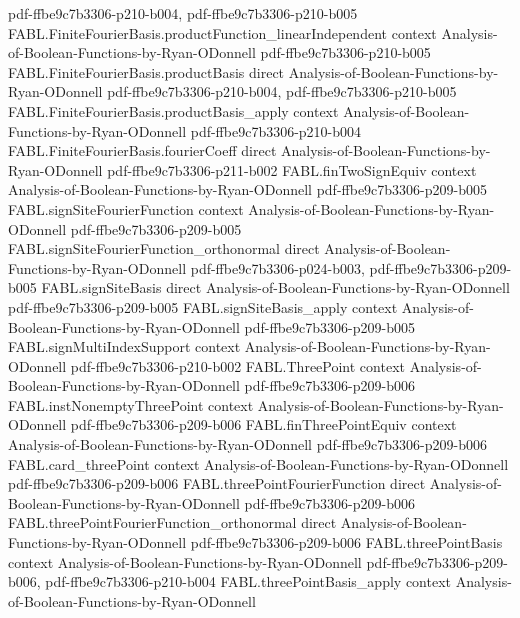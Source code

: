\begin{theorem}
  {pdf-ffbe9c7b3306-p210-b004,
    pdf-ffbe9c7b3306-p210-b005}
\proofstep
  {FABL.FiniteFourierBasis.productFunction_linearIndependent}
  {context}
  {Analysis-of-Boolean-Functions-by-Ryan-ODonnell}
  {pdf-ffbe9c7b3306-p210-b005}
\proofstep
  {FABL.FiniteFourierBasis.productBasis}
  {direct}
  {Analysis-of-Boolean-Functions-by-Ryan-ODonnell}
  {pdf-ffbe9c7b3306-p210-b004,
    pdf-ffbe9c7b3306-p210-b005}
\proofstep
  {FABL.FiniteFourierBasis.productBasis_apply}
  {context}
  {Analysis-of-Boolean-Functions-by-Ryan-ODonnell}
  {pdf-ffbe9c7b3306-p210-b004}
\proofstep
  {FABL.FiniteFourierBasis.fourierCoeff}
  {direct}
  {Analysis-of-Boolean-Functions-by-Ryan-ODonnell}
  {pdf-ffbe9c7b3306-p211-b002}
\proofstep
  {FABL.finTwoSignEquiv}
  {context}
  {Analysis-of-Boolean-Functions-by-Ryan-ODonnell}
  {pdf-ffbe9c7b3306-p209-b005}
\proofstep
  {FABL.signSiteFourierFunction}
  {context}
  {Analysis-of-Boolean-Functions-by-Ryan-ODonnell}
  {pdf-ffbe9c7b3306-p209-b005}
\proofstep
  {FABL.signSiteFourierFunction_orthonormal}
  {direct}
  {Analysis-of-Boolean-Functions-by-Ryan-ODonnell}
  {pdf-ffbe9c7b3306-p024-b003,
    pdf-ffbe9c7b3306-p209-b005}
\proofstep
  {FABL.signSiteBasis}
  {direct}
  {Analysis-of-Boolean-Functions-by-Ryan-ODonnell}
  {pdf-ffbe9c7b3306-p209-b005}
\proofstep
  {FABL.signSiteBasis_apply}
  {context}
  {Analysis-of-Boolean-Functions-by-Ryan-ODonnell}
  {pdf-ffbe9c7b3306-p209-b005}
\proofstep
  {FABL.signMultiIndexSupport}
  {context}
  {Analysis-of-Boolean-Functions-by-Ryan-ODonnell}
  {pdf-ffbe9c7b3306-p210-b002}
\proofstep
  {FABL.ThreePoint}
  {context}
  {Analysis-of-Boolean-Functions-by-Ryan-ODonnell}
  {pdf-ffbe9c7b3306-p209-b006}
\proofstep
  {FABL.instNonemptyThreePoint}
  {context}
  {Analysis-of-Boolean-Functions-by-Ryan-ODonnell}
  {pdf-ffbe9c7b3306-p209-b006}
\proofstep
  {FABL.finThreePointEquiv}
  {context}
  {Analysis-of-Boolean-Functions-by-Ryan-ODonnell}
  {pdf-ffbe9c7b3306-p209-b006}
\proofstep
  {FABL.card_threePoint}
  {context}
  {Analysis-of-Boolean-Functions-by-Ryan-ODonnell}
  {pdf-ffbe9c7b3306-p209-b006}
\proofstep
  {FABL.threePointFourierFunction}
  {direct}
  {Analysis-of-Boolean-Functions-by-Ryan-ODonnell}
  {pdf-ffbe9c7b3306-p209-b006}
\proofstep
  {FABL.threePointFourierFunction_orthonormal}
  {direct}
  {Analysis-of-Boolean-Functions-by-Ryan-ODonnell}
  {pdf-ffbe9c7b3306-p209-b006}
\proofstep
  {FABL.threePointBasis}
  {context}
  {Analysis-of-Boolean-Functions-by-Ryan-ODonnell}
  {pdf-ffbe9c7b3306-p209-b006,
    pdf-ffbe9c7b3306-p210-b004}
\proofstep
  {FABL.threePointBasis_apply}
  {context}
  {Analysis-of-Boolean-Functions-by-Ryan-ODonnell}

\end{theorem}
